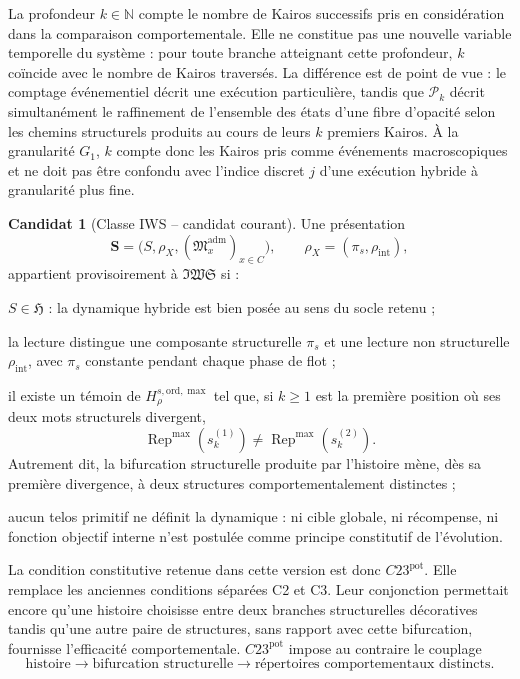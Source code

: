 \documentclass[11pt,a4paper]{article}
\theoremstyle{definition}
\newtheorem{candidate}[definition]{Candidat}
\theoremstyle{remark}
\newcommand{\IWS}{\mathfrak{IWS}}
\newcommand{\Hyb}{\mathfrak H}
\newcommand{\Madm}{\mathfrak M^{\mathrm{adm}}}
\newcommand{\Rep}{\operatorname{Rep}}
\begin{document}
La profondeur $k\in\mathbb N$ compte le nombre de Kairos successifs pris en considération dans la comparaison comportementale. Elle ne constitue pas une nouvelle variable temporelle du système : pour toute branche atteignant cette profondeur, $k$ coïncide avec le nombre de Kairos traversés. La différence est de point de vue : le comptage événementiel décrit une exécution particulière, tandis que $\mathcal P_k$ décrit simultanément le raffinement de l'ensemble des états d'une fibre d'opacité selon les chemins structurels produits au cours de leurs $k$ premiers Kairos. À la granularité $G_1$, $k$ compte donc les Kairos pris comme événements macroscopiques et ne doit pas être confondu avec l'indice discret $j$ d'une exécution hybride à granularité plus fine.


\begin{candidate}[Classe IWS -- candidat courant]
Une présentation
\[
\mathbf S=\bigl(S,\rho_X,(\Madm_x)_{x\in C}\bigr),
\qquad
\rho_X=(\pi_s,\rho_{\mathrm{int}}),
\]
appartient provisoirement à $\IWS$ si :
\begin{description}[leftmargin=3.5em,labelwidth=3em]
\item[C0] $S\in\Hyb$ : la dynamique hybride est bien posée au sens du socle retenu ;
\item[C1] la lecture distingue une composante structurelle $\pi_s$ et une lecture non structurelle $\rho_{\mathrm{int}}$, avec $\pi_s$ constante pendant chaque phase de flot ;
\item[C23$^{\mathrm{pot}}$] il existe un témoin de $H_{\rho}^{s,\mathrm{ord},\max}$ tel que, si $k\geq1$ est la première position où ses deux mots structurels divergent,
\[
\boxed{
\Rep^{\max}\!\left(s_k^{(1)}\right)
\neq
\Rep^{\max}\!\left(s_k^{(2)}\right).}
\]
Autrement dit, la bifurcation structurelle produite par l'histoire mène, dès sa première divergence, à deux structures comportementalement distinctes ;
\item[C4] aucun telos primitif ne définit la dynamique : ni cible globale, ni récompense, ni fonction objectif interne n'est postulée comme principe constitutif de l'évolution.
\end{description}
\end{candidate}

La condition constitutive retenue dans cette version est donc $C23^{\mathrm{pot}}$. Elle remplace les anciennes conditions séparées C2 et C3. Leur conjonction permettait encore qu'une histoire choisisse entre deux branches structurelles décoratives tandis qu'une autre paire de structures, sans rapport avec cette bifurcation, fournisse l'efficacité comportementale. $C23^{\mathrm{pot}}$ impose au contraire le couplage
\[
\boxed{
\text{histoire}
\longrightarrow
\text{bifurcation structurelle}
\longrightarrow
\text{répertoires comportementaux distincts}.}
\]
\end{document}
